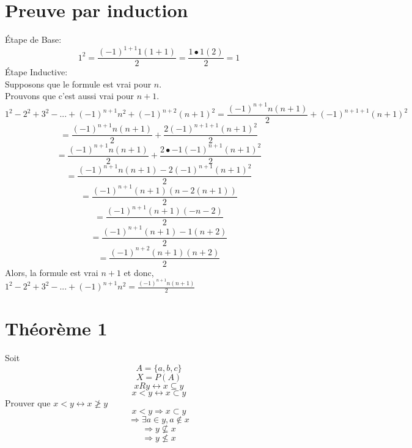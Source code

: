 \documentclass[a4paper,12pt]{article}
\begin{document}
\section{Preuve par induction}
Étape de Base:\\
	\[1^2 = \frac{(-1)^{1+1}1(1+1)}{2} = \frac{1\bullet 1 (2)}{2} = 1\]	
Étape Inductive:\\
	Supposons que le formule est vrai pour $n$.\\
	Prouvons que c'est aussi vrai pour $n+1$.
	\[1^2 - 2^2 + 3^2 - ... + (-1)^{n+1}n^2 + (-1)^{n+2}(n+1)^2 = \frac{(-1)^{n+1}n(n+1)}{2}  + (-1)^{n+1+1}(n+1)^2 \]
	\[= \frac{(-1)^{n+1}n(n+1)}{2}  + \frac{2(-1)^{n+1+1}(n+1)^2}{2}\]
	\[= \frac{(-1)^{n+1}n(n+1)}{2}  + \frac{2\bullet-1(-1)^{n+1}(n+1)^2}{2}\]
	\[= \frac{(-1)^{n+1}n(n+1)  -2(-1)^{n+1}(n+1)^2}{2}\]
	\[= \frac{(-1)^{n+1}(n+1)(n  -2(n+1))}{2}\]
	\[= \frac{(-1)^{n+1}(n+1)(-n-2)}{2}\]
	\[= \frac{(-1)^{n+1}(n+1) -1 (n+2)}{2}\]
	\[= \frac{(-1)^{n+2}(n+1)(n+2)}{2}\]
	Alors, la formule est vrai $n+1$ et donc, $1^2 - 2^2 + 3^2 - ... + (-1)^{n+1}n^2 = \frac{(-1)^{n+1}n(n+1)}{2}$
\section{Théorème 1}
	Soit
	\[A = \{a, b, c\}\]
	\[X = P(A)\]
	\[x R y \leftrightarrow x \subseteq y \]
	\[ x < y \leftrightarrow x \subset y  \]
	Prouver que $ x < y \leftrightarrow x \ngeq y$\\
	\linebreak
	\[ x < y \Longrightarrow x \subset y\]
	\[ \Longrightarrow \exists a \in y , a \notin x \]
	\[ \Longrightarrow y \not \subseteq x \]
	\[ \Longrightarrow y \not\leq x \]
\newpage
\end{document}

